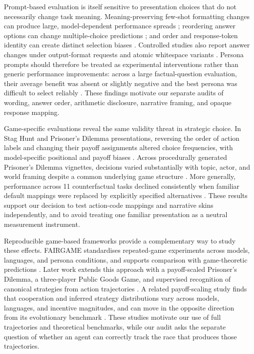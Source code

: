 \documentclass[sigconf]{aamas}
\begin{document}
Prompt-based evaluation is itself sensitive to presentation choices that do
not necessarily change task meaning. Meaning-preserving few-shot formatting
changes can produce large, model-dependent performance spreads
\citep{sclarPromptFormatting2024}; reordering answer options can change
multiple-choice predictions \citep{pezeshkpourOptionOrder2024}; and order
and response-token identity can create distinct selection biases
\citep{weiSelectionBias2024}. Controlled studies also report answer changes
under output-format requests and atomic whitespace variants
\citep{salinasButterfly2024}. Persona prompts should therefore be treated as
experimental interventions rather than generic performance improvements:
across a large factual-question evaluation, their average benefit was absent
or slightly negative and the best persona was difficult to select reliably
\citep{zhengPersona2024}. These findings motivate our separate audits of
wording, answer order, arithmetic disclosure, narrative framing, and opaque
response mapping.

Game-specific evaluations reveal the same validity threat in strategic
choice. In Stag Hunt and Prisoner's Dilemma presentations, reversing the
order of action labels and changing their payoff assignments altered choice
frequencies, with model-specific positional and payoff biases
\citep{herrStrategicBias2024}. Across procedurally generated Prisoner's
Dilemma vignettes, decisions varied substantially with topic, actor, and
world framing despite a common underlying game structure
\citep{robinsonBurdenFraming2025}. More generally, performance across 11
counterfactual tasks declined consistently when familiar default mappings
were replaced by explicitly specified alternatives
\citep{wuCounterfactual2024}. These results support our decision to test
action-code mappings and narrative skins independently, and to avoid treating
one familiar presentation as a neutral measurement instrument.

Reproducible game-based frameworks provide a complementary way to study these
effects. FAIRGAME standardises repeated-game experiments across models,
languages, and persona conditions, and supports comparison with game-theoretic
predictions \citep{buscemiFAIRGAME2025}. Later work extends this approach with
a payoff-scaled Prisoner's Dilemma, a three-player Public Goods Game, and
supervised recognition of canonical strategies from action trajectories
\citep{huynhUnderstanding2025}. A related payoff-scaling study finds that
cooperation and inferred strategy distributions vary across models, languages,
and incentive magnitudes, and can move in the opposite direction from its
evolutionary benchmark \citep{huynhPayoffScaling2026}. These studies motivate
our use of full trajectories and theoretical benchmarks, while our audit asks
the separate question of whether an agent can correctly track the race that
produces those trajectories.
\end{document}
